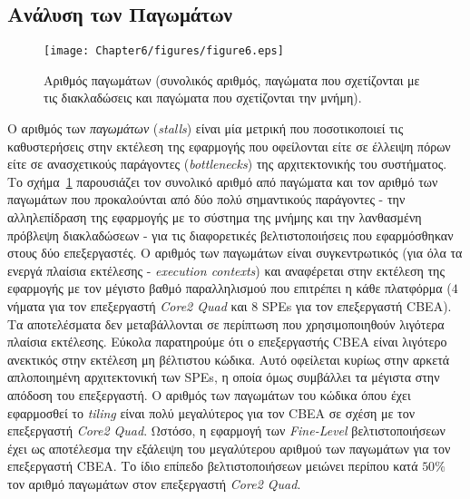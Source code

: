 \subsection[6.2.3 Ανάλυση των Παγωμάτων]{Ανάλυση των Παγωμάτων}
\label{subsection:sub623}
\begin{figure}
\centering
\texttt{[image: Chapter6/figures/figure6.eps]}
\caption{Αριθμός παγωμάτων (συνολικός αριθμός, παγώματα που σχετίζονται με τις διακλαδώσεις και παγώματα που σχετίζονται την μνήμη).}
\label{figure:fig66}
\end{figure}
\indent
Ο αριθμός των \textsl{παγωμάτων} (\textsl{stalls}) είναι μία μετρική που ποσοτικοποιεί τις καθυστερήσεις στην εκτέλεση της εφαρμογής που οφείλονται είτε σε έλλειψη πόρων είτε σε ανασχετικούς παράγοντες (\textsl{bottlenecks}) της αρχιτεκτονικής του συστήματος. Το σχήμα~\ref{figure:fig66} παρουσιάζει τον συνολικό αριθμό από παγώματα και τον αριθμό των παγωμάτων που προκαλούνται από δύο πολύ σημαντικούς παράγοντες - την αλληλεπίδραση της εφαρμογής με το σύστημα της μνήμης και την λανθασμένη πρόβλεψη διακλαδώσεων - για τις διαφορετικές βελτιστοποιήσεις που εφαρμόσθηκαν στους δύο επεξεργαστές. Ο αριθμός των παγωμάτων είναι συγκεντρωτικός (για όλα τα ενεργά πλαίσια εκτέλεσης - \textsl{execution contexts}) και αναφέρεται στην εκτέλεση της εφαρμογής με τον μέγιστο βαθμό παραλληλισμού που επιτρέπει η κάθε πλατφόρμα (\(4\) νήματα για τον επεξεργαστή \textsl{Core2 Quad} και \(8\) \acp{SPE} για τον επεξεργαστή \ac{CBEA}). Τα αποτελέσματα δεν μεταβάλλονται σε περίπτωση που χρησιμοποιηθούν λιγότερα πλαίσια εκτέλεσης.\newline \indent
Εύκολα παρατηρούμε ότι ο επεξεργαστής \ac{CBEA} είναι λιγότερο ανεκτικός στην εκτέλεση μη βέλτιστου κώδικα. Αυτό οφείλεται κυρίως στην αρκετά απλοποιημένη αρχιτεκτονική των \acp{SPE}, η οποία όμως συμβάλλει τα μέγιστα στην απόδοση του επεξεργαστή. Ο αριθμός των παγωμάτων του κώδικα όπου έχει εφαρμοσθεί το \textsl{tiling} είναι πολύ μεγαλύτερος για τον \ac{CBEA} σε σχέση με τον επεξεργαστή \textsl{Core2 Quad}. Ωστόσο, η εφαρμογή των \textsl{Fine-Level} βελτιστοποιήσεων έχει ως αποτέλεσμα την εξάλειψη του μεγαλύτερου αριθμού των παγωμάτων για τον επεξεργαστή \ac{CBEA}. Το ίδιο επίπεδο βελτιστοποιήσεων μειώνει περίπου κατά \(50\%\) τον αριθμό παγωμάτων στον επεξεργαστή \textsl{Core2 Quad}.\newline \indent

